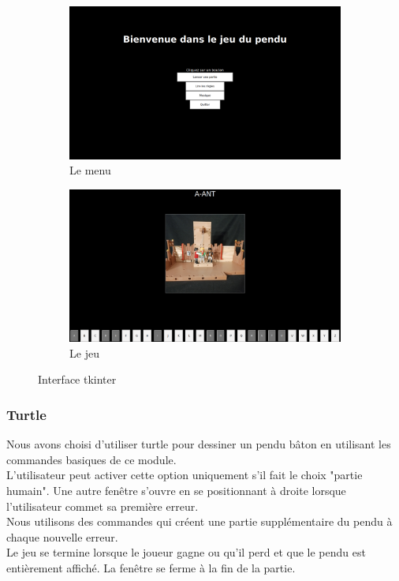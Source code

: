 \documentclass[french,10pt,a4paper]{article}	%
\begin{document}
		\begin{figure}[!ht]
			\begin{subfigure}{0.5\textwidth}
    				\centering
    				\includegraphics[scale=0.1]{accueil.png}
   		 			\caption{Le menu}
   		 			\centering
			\end{subfigure}
			\begin{subfigure}{0.5\textwidth}
   			 		\centering
    				\includegraphics[scale=0.1]{jeu.png}
    				\caption{Le jeu}
    				\centering
			\end{subfigure}
    			\caption{Interface tkinter}
		\end{figure}
		
		\subsubsection{Turtle}
		
		
		Nous avons choisi d'utiliser turtle pour dessiner un pendu bâton en utilisant les commandes basiques de ce module. \\
		L'utilisateur peut activer cette option uniquement s'il fait le choix "partie humain". Une autre fenêtre s'ouvre en se positionnant à droite lorsque l'utilisateur commet sa première erreur.\\
		Nous utilisons des commandes qui créent une partie supplémentaire du pendu à chaque nouvelle erreur.\\
	 Le jeu se termine lorsque le joueur gagne ou qu'il perd et que le pendu est entièrement affiché. La fenêtre se ferme à la fin de la partie.
		
\end{document}
